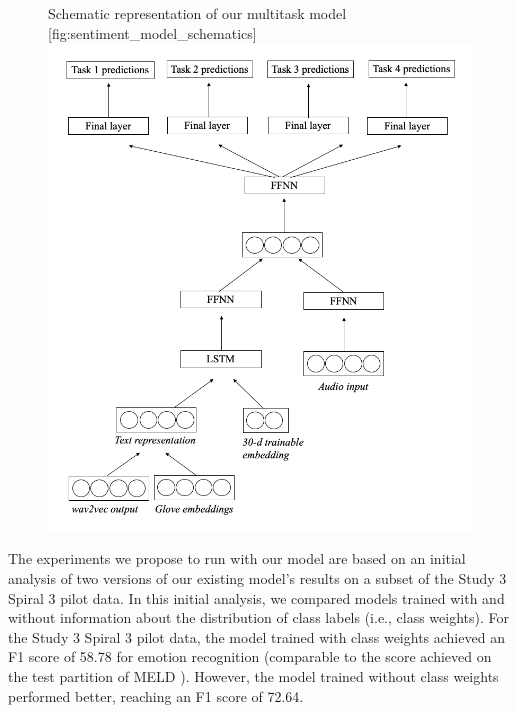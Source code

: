 \begin{figure}
    \begin{sidecaption}{%
        Schematic representation of our multitask model
    }[fig:sentiment_model_schematics]
    \includegraphics[width=\textwidth]{images/sentiment_schematics_study3.png}
    \end{sidecaption}
\end{figure}

The experiments we propose to run with our model are based on an initial
analysis of two versions of our existing model's results on a subset of the
Study 3 Spiral 3 pilot data. In this initial analysis, we compared models
trained with and without information about the distribution of class labels
(i.e., class weights).  For the Study 3 Spiral 3 pilot data, the model trained
with class weights achieved an F1 score of 58.78 for emotion recognition
(comparable to the score achieved on the test partition of MELD ). However, the model trained
without class weights performed better, reaching an F1 score of 72.64.

